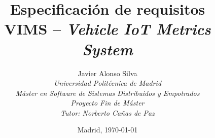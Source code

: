 \def\University{\textit{Universidad Politécnica de Madrid}}
\def\Course{\textit{Máster en Software de Sistemas Distribuidos y Empotrados}}
\def\Module{\textit{Proyecto Fin de Máster}}
\def\Docent{\textit{Tutor: Norberto Cañas de Paz}}

\def\BoldTitle{Especificación de requisitos}
\def\Subtitle{VIMS -- \textit{Vehicle IoT Metrics System}}
\def\Authors{Javier Alonso Silva}
\def\Shortname{J. Alonso}

\title{\textbf{\BoldTitle}\\\Subtitle}
\author{\Authors \\\University\\\Course\\\Module\\\Docent}
\date{Madrid, \today}